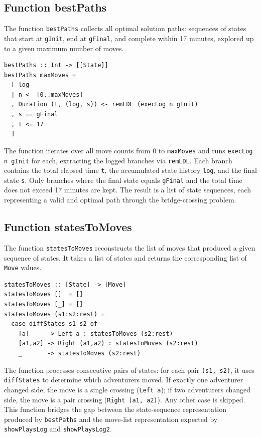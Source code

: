 \documentclass[a4paper,12pt]{report}
\begin{document}
\subsection{Function bestPaths}
The function \texttt{bestPaths} collects all optimal solution paths:
sequences of states that start at \texttt{gInit}, end at \texttt{gFinal},
and complete within 17 minutes, explored up to a given maximum number of moves.
\begin{verbatim}
bestPaths :: Int -> [[State]]
bestPaths maxMoves =
  [ log
  | n <- [0..maxMoves]
  , Duration (t, (log, s)) <- remLDL (execLog n gInit)
  , s == gFinal
  , t <= 17
  ]
\end{verbatim}
The function iterates over all move counts from 0 to \texttt{maxMoves}
and runs \texttt{execLog n gInit} for each, extracting the logged
branches via \texttt{remLDL}. Each branch contains the total elapsed
time \texttt{t}, the accumulated state history \texttt{log}, and the
final state \texttt{s}. Only branches where the final state equals
\texttt{gFinal} and the total time does not exceed 17 minutes are kept.
The result is a list of state sequences, each representing a valid and
optimal path through the bridge-crossing problem.
\subsection{Function statesToMoves}
The function \texttt{statesToMoves} reconstructs the list of moves
that produced a given sequence of states. It takes a list of states
and returns the corresponding list of \texttt{Move} values.
\begin{verbatim}
statesToMoves :: [State] -> [Move]
statesToMoves []  = []
statesToMoves [_] = []
statesToMoves (s1:s2:rest) =
  case diffStates s1 s2 of
    [a]     -> Left a : statesToMoves (s2:rest)
    [a1,a2] -> Right (a1,a2) : statesToMoves (s2:rest)
    _       -> statesToMoves (s2:rest)
\end{verbatim}
The function processes consecutive pairs of states: for each pair
\texttt{(s1, s2)}, it uses \texttt{diffStates} to determine which
adventurers moved. If exactly one adventurer changed side, the move is
a single crossing (\texttt{Left a}); if two adventurers changed side,
the move is a pair crossing (\texttt{Right (a1, a2)}). Any other case
is skipped. This function bridges the gap between the state-sequence
representation produced by \texttt{bestPaths} and the move-list
representation expected by \texttt{showPlaysLog} and
\texttt{showPlaysLog2}.
\end{document}
